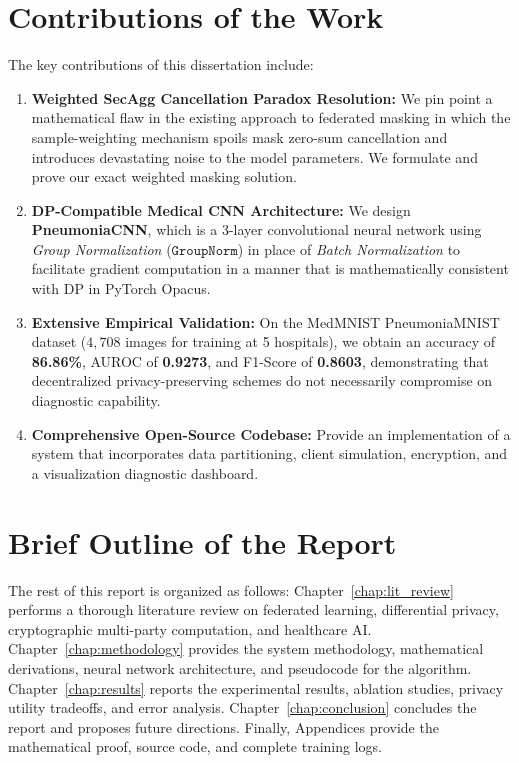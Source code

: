 \documentclass[12pt,a4paper]{report}
\begin{document}
\section{Contributions of the Work}
The key contributions of this dissertation include:
\begin{enumerate}
    \item \textbf{Weighted SecAgg Cancellation Paradox Resolution:} We pin point a mathematical flaw in the existing approach to federated masking in which the sample-weighting mechanism spoils mask zero-sum cancellation and introduces devastating noise to the model parameters. We formulate and prove our exact weighted masking solution.
    \item \textbf{DP-Compatible Medical CNN Architecture:} We design \textbf{PneumoniaCNN}, which is a 3-layer convolutional neural network using \textit{Group Normalization} ($\texttt{GroupNorm}$) in place of \textit{Batch Normalization} to facilitate gradient computation in a manner that is mathematically consistent with DP in PyTorch Opacus.
    \item \textbf{Extensive Empirical Validation:} On the MedMNIST PneumoniaMNIST dataset ($4{,}708$ images for training at 5 hospitals), we obtain an accuracy of \textbf{86.86\%}, AUROC of \textbf{0.9273}, and F1-Score of \textbf{0.8603}, demonstrating that decentralized privacy-preserving schemes do not necessarily compromise on diagnostic capability.
    \item \textbf{Comprehensive Open-Source Codebase:} Provide an implementation of a system that incorporates data partitioning, client simulation, encryption, and a visualization diagnostic dashboard.
\end{enumerate}

\section{Brief Outline of the Report}
The rest of this report is organized as follows: Chapter~\ref{chap:lit_review} performs a thorough literature review on federated learning, differential privacy, cryptographic multi-party computation, and healthcare AI. Chapter~\ref{chap:methodology} provides the system methodology, mathematical derivations, neural network architecture, and pseudocode for the algorithm. Chapter~\ref{chap:results} reports the experimental results, ablation studies, privacy utility tradeoffs, and error analysis. Chapter~\ref{chap:conclusion} concludes the report and proposes future directions. Finally, Appendices provide the mathematical proof, source code, and complete training logs.
\end{document}
